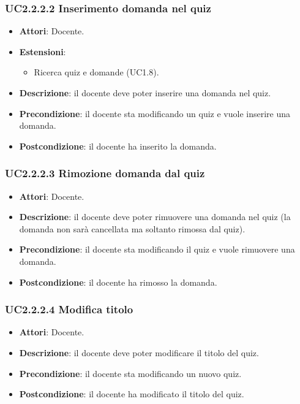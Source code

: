 \subsubsection{UC2.2.2.2 Inserimento domanda nel quiz}
\begin{itemize}
\item \textbf{Attori}: Docente.
\item \textbf{Estensioni}:
\begin{itemize}
\item Ricerca quiz e domande (UC1.8).
\end{itemize}
\item \textbf{Descrizione}: il docente deve poter inserire una domanda nel quiz.
\item \textbf{Precondizione}: il docente sta modificando un quiz e vuole inserire una domanda.
\item \textbf{Postcondizione}: il docente ha inserito la domanda.
\end{itemize}
\subsubsection{UC2.2.2.3 Rimozione domanda dal quiz}
\begin{itemize}
\item \textbf{Attori}: Docente.
\item \textbf{Descrizione}: il docente deve poter rimuovere una domanda nel quiz (la domanda non sarà cancellata ma soltanto rimossa dal quiz).
\item \textbf{Precondizione}: il docente sta modificando il quiz e vuole rimuovere una domanda.
\item \textbf{Postcondizione}: il docente ha rimosso la domanda.
\end{itemize}
\subsubsection{UC2.2.2.4 Modifica titolo}
\begin{itemize}
\item \textbf{Attori}: Docente.
\item \textbf{Descrizione}: il docente deve poter modificare il titolo del quiz.
\item \textbf{Precondizione}: il docente sta modificando un nuovo quiz.
\item \textbf{Postcondizione}: il docente ha modificato il titolo del quiz.
\end{itemize}
